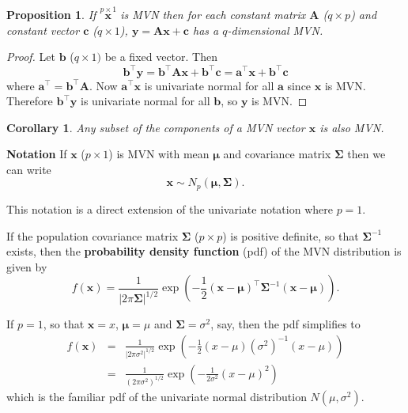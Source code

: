 \documentclass[]{book}
\newtheorem{corollary}{Corollary}[chapter]
\newtheorem{proposition}{Proposition}[chapter]
\theoremstyle{definition}
\theoremstyle{definition}
\theoremstyle{definition}
\theoremstyle{remark}
\begin{document}
\begin{proposition}
\protect\hypertarget{prp:six1}{}{\label{prp:six1} }If \(\stackrel{p \times 1}{\boldsymbol x}\) is MVN then for each constant matrix \(\boldsymbol A\) (\(q \times p\)) and constant vector \(\boldsymbol c\) (\(q \times 1\)), \(\boldsymbol y= \boldsymbol A\boldsymbol x+ \boldsymbol c\) has a \(q\)-dimensional MVN.
\end{proposition}

\begin{proof}
{}Let \(\boldsymbol b\) (\(q \times 1)\) be a fixed vector. Then
\[ \boldsymbol b^\top \boldsymbol y= \boldsymbol b^\top \boldsymbol A\boldsymbol x+ \boldsymbol b^\top \boldsymbol c= \boldsymbol a^\top \boldsymbol x+ \boldsymbol b^\top \boldsymbol c\]
where \(\boldsymbol a^\top = \boldsymbol b^\top \boldsymbol A\). Now \(\boldsymbol a^\top \boldsymbol x\) is univariate normal for all \(\boldsymbol a\) since \(\boldsymbol x\) is MVN. Therefore \(\boldsymbol b^\top \boldsymbol y\) is univariate normal for all \(\boldsymbol b\), so \(\boldsymbol y\) is MVN.
\end{proof}

\begin{corollary}
\protect\hypertarget{cor:csix1}{}{\label{cor:csix1} }Any subset of the components of a MVN vector \(\boldsymbol x\) is also MVN.
\end{corollary}

\textbf{Notation} \quad If \(\boldsymbol x\) (\(p \times 1\)) is MVN with mean \(\boldsymbol \mu\) and covariance matrix \(\boldsymbol \Sigma\) then we can write
\[ \boldsymbol x\sim N_p (\boldsymbol \mu, \boldsymbol \Sigma).\]

This notation is a direct extension of the univariate notation where \(p=1\).

If the population covariance matrix \(\boldsymbol \Sigma\) (\(p \times p\)) is positive definite, so that \(\boldsymbol \Sigma^{-1}\) exists,
then the \textbf{probability density function} (pdf) of the MVN distribution is given by
\[ f(\boldsymbol x) = \frac{1}{| 2 \pi \boldsymbol \Sigma|^{1/2}} \exp \left(-\frac{1}{2}(\boldsymbol x- \boldsymbol \mu)^\top \boldsymbol \Sigma^{-1} (\boldsymbol x- \boldsymbol \mu) \right).\]

If \(p=1\), so that \(\boldsymbol x= x\), \(\boldsymbol \mu= \mu\) and \(\boldsymbol \Sigma= \sigma^2\), say, then the pdf simplifies to
\begin{eqnarray*}
f(\boldsymbol x) &=& \frac{1}{|2 \pi \sigma^2|^{1/2}} \exp \left(-\frac{1}{2}(x - \mu) (\sigma^2)^{-1} (x - \mu) \right)\\
&=& \frac{1}{(2 \pi \sigma^2)^{1/2}} \exp \left(-\frac{1}{2 \sigma^2}(x - \mu)^2 \right)
\end{eqnarray*}
which is the familiar pdf of the univariate normal distribution \(N(\mu,\sigma^2)\).
\end{document}

